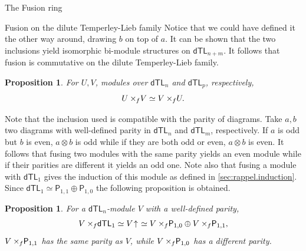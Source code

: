 \documentclass[reqno]{amsart}
\newtheorem{Prop}[Thm]{Proposition}
\newcommand{\dtl}[1]{\mathsf{dTL}_{#1}}
\newcommand{\dP}[1]{\mathsf P_{#1}}
\newcommand{\xf}{\times\hspace{-0.27em}_f}
\newcommand{\Ind}[1]{#1{}\hspace{-0.18em} \uparrow{}\hskip -0.18em}
\begin{document}
\begin{section}{The Fusion ring}
\begin{subsection}{Fusion on the dilute Temperley-Lieb family}
Notice that we could have defined it the other way around, drawing $b$ on top of $a$. It can be shown that the two inclusions yield isomorphic bi-module structures on $\dtl{n+m}$. It follows that fusion is commutative on the dilute Temperley-Lieb family.
\begin{Prop}
For $U,V$, modules over $\dtl{n}$ and $\dtl{p}$, respectively, $$U\xf V \simeq V\xf U. $$ 
\end{Prop}
Note that the inclusion used is compatible with the parity of diagrams. Take $a,b$ two diagrams with well-defined parity in $\dtl{n}$ and $\dtl{m}$, respectively. If $a$ is odd but $b$ is even, $a \otimes b$ is odd  while if they are both odd or even, $a\otimes b$ is even. It follows that fusing two modules with the same parity yields an even module while if their parities are different it yields an odd one. Note also that fusing a module with $\dtl{1}$ gives the induction of this module as defined in \ref{sec:rappel.induction}. Since $\dtl{1}\simeq \dP{1,1} \oplus \dP{1,0}$ the following proposition is obtained.
\begin{Prop}\label{prop:fusion_parity}
For a $\dtl{n}$-module $V$ with a well-defined parity,
$$ V\xf \dtl{1} \simeq \Ind{V} \simeq V\xf \dP{1,0} \oplus V \xf \dP{1,1},$$
 $V\xf\dP{1,1}$ has the same parity as $V$, while $V\xf \dP{1,0}$ has a different parity.
\end{Prop}


\end{subsection}
\end{section}
\end{document}
